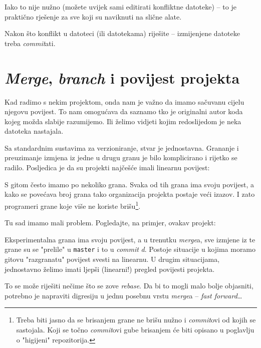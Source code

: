 
Iako to nije nužno (možete uvijek sami editirati konfliktne datoteke) -- to je praktično rješenje za sve koji su naviknuti na slične alate.

Nakon što konflikt u datoteci (ili datotekama) riješite -- izmijenjene datoteke treba \emph{commit}ati.

\section*{\emph{Merge}, \emph{branch} i povijest projekta}

Kad radimo s nekim projektom, onda nam je važno da imamo sačuvanu cijelu njegovu povijest.
To nam omogućava da saznamo tko je originalni autor koda kojeg možda slabije razumijemo.
Ili želimo vidjeti kojim redoslijedom je neka datoteka nastajala.

Sa standardnim sustavima za verzioniranje, stvar je jednostavna. 
Grananje i preuzimanje izmjena iz jedne u drugu granu je bilo komplicirano i rijetko se radilo. 
Posljedica je da su projekti najčešće imali linearnu povijest:



S gitom često imamo po nekoliko grana.
Svaka od tih grana ima svoju povijest, a kako se povećava broj grana tako organizacija projekta postaje veći izazov.
I zato programeri grane koje više ne koriste brišu\footnote{Treba biti jasno da se brisanjem grane ne brišu nužno i \emph{commit}ovi od kojih se sastojala. Koji se točno \emph{commit}ovi gube brisanjem će biti opisano u poglavlju o "higijeni" repozitorija.}.

Tu sad imamo mali problem.
Pogledajte, na primjer, ovakav projekt:



Eksperimentalna grana ima svoju povijest, a u trenutku \emph{merge}a, sve izmjene iz te grane su se "prelile" u \verb+master+ i to u \emph{commit} \emph d.
Postoje situacije u kojima moramo gitovu "razgranatu" povijest svesti na linearnu.
U drugim situacijama, jednostavno želimo imati ljepši (linearni!) pregled povijesti projekta.

To se može riješiti nečime što se zove \emph{rebase}.
Da bi to mogli malo bolje objasniti, potrebno je napraviti digresiju u jednu posebnu vrstu \emph{merge}a -- \emph{fast forward}\dots

